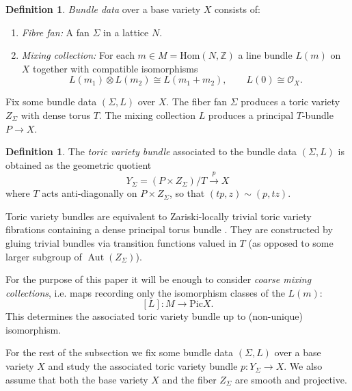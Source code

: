 \documentclass[oneside]{amsart}
\theoremstyle{plain}
\theoremstyle{definition}
\newtheorem{definition}[theorem]{Definition}
\newcommand{\Z}{{\mathbb{Z}}}
\newcommand{\Om}{{\mathcal{O}}}
\newcommand{\Hom}{{\mathrm{Hom}}}
\newcommand{\Pic}{{\mathrm{Pic}}}
\begin{document}
 
\begin{definition} \emph{Bundle data} over a base variety $X$ consists of:
\begin{enumerate}
\item \emph{Fibre fan:} A fan $\Sigma$ in a lattice $N$.\smallskip
\item \emph{Mixing collection:} For each $m \in M=\Hom(N,\Z)$ a line bundle $L(m)$ on $X$ together with compatible isomorphisms
\[ L(m_1) \otimes L(m_2) \cong L(m_1+m_2), \qquad L(0) \cong \Om_X. \]
\end{enumerate}
\end{definition}


Fix some bundle data $(\Sigma,L)$ over $X$. The fiber fan $\Sigma$ produces a toric variety $Z_\Sigma$ with dense torus $T$. The mixing collection $L$ produces a principal $T$-bundle $P \to X$.

\begin{definition} \label{def: toric variety bundle}The \emph{toric variety bundle} associated to the bundle data $(\Sigma,L)$ is obtained as the geometric quotient
\[
Y_\Sigma = (P\times Z_\Sigma) \slash T \xrightarrow{p}  X
\]
where $T$ acts anti-diagonally on $P \times Z_\Sigma$, so that $(tp,z) \sim (p,tz)$. 
\end{definition}
Toric variety bundles are equivalent to Zariski-locally trivial toric variety fibrations containing a dense principal torus bundle \cite[Lemma~3.4]{CarocciNabijou2}. They are constructed by gluing trivial bundles via transition functions valued in $T$ 
(as opposed to some larger subgroup of $\operatorname{Aut}
(Z_\Sigma)$).

For the purpose of this paper it will be enough to consider \emph{coarse mixing collections}, i.e. maps recording only the isomorphism classes of the $L(m)$:
\[ 
[L] \colon M \to  \Pic X.
\]
This determines the associated toric variety bundle up to (non-unique) isomorphism. 

For the rest of the subsection we fix some bundle data $(\Sigma,L)$ over a base variety $X$ and study the associated toric variety bundle $p \colon Y_\Sigma \to X$. We also assume that both the base variety $X$ and the fiber $Z_\Sigma$ are smooth and projective. 
\end{document}
